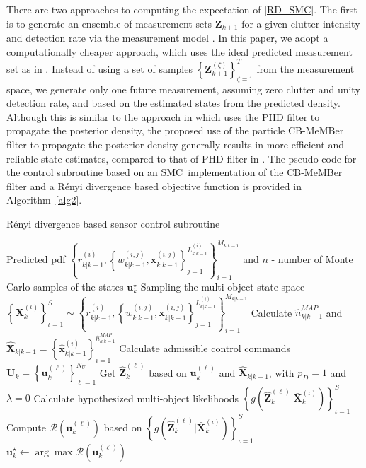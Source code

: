 \documentclass[twocolumn]{autart}
\begin{document}
There are two approaches to computing the expectation of \eqref{RD_SMC}. The
first is to generate an ensemble of measurement sets $\mathbf{Z}_{k+1}$ for
a given clutter intensity and detection rate via the measurement model \cite {RV10}. In this paper, we adopt a computationally cheaper approach, which
uses the ideal predicted measurement set as in \cite{Mah04,RVC11}. Instead
of using a set of samples $\left\{ \mathbf{Z}_{k+1}^{(\zeta)}\right\}
_{\zeta=1}^{T}$ from the measurement space, we generate only one future
measurement, assuming zero clutter and unity detection rate, and based on
the estimated states from the predicted density. Although this is similar to
the approach in \cite{RVC11} which uses the PHD filter to propagate the
posterior density, the proposed use of the particle CB-MeMBer filter to
propagate the posterior density generally results in more efficient and
reliable state estimates, compared to that of PHD filter in \cite{RVC11}. The pseudo code for the control subroutine based on an SMC\
implementation of the CB-MeMBer filter and a R\'{e}nyi divergence based objective function is
provided in Algorithm~\ref{alg2}.
\begin{algorithm}[htb]
\caption{R\'enyi divergence based sensor control subroutine}
\label{alg2}
\begin{algorithmic}[1]
    \Require Predicted pdf $\left\lbrace r_{k|k-1}^{(i)}, \left\lbrace w_{k|k-1}^{(i,j)},\mathbf{x}_{k|k-1}^{(i,j)}\right\rbrace_{j=1}^{L_{k|k-1}^{(i)}}\right\rbrace_{i=1}^{M_{k|k-1}}$ and $n$ - number of Monte Carlo samples of the states 
    \Ensure $\mathbf{u}_k^\star$
    \State Sampling the multi-object state space
    \Statex \quad \; $\left\{\mathbf{\bar{X}}_{k}^{(\iota)}\right\}_{\iota=1}^{S} \sim \left\lbrace r_{k|k-1}^{(i)}, \left\lbrace w_{k|k-1}^{(i,j)},\mathbf{x}_{k|k-1}^{(i,j)}\right\rbrace_{j=1}^{L_{k|k-1}^{(i)}}\right\rbrace_{i=1}^{M_{k|k-1}}$
    \State Calculate $\hat{n}^{MAP}_{k|k-1}$ and $\mathbf{\hat{X}}_{k|k-1}=\left\{\mathbf{\hat{x}}_{k|k-1}^{(i)}\right\}_{i=1}^{\hat{n}^{MAP}_{k|k-1}}$
    \State Calculate admissible control commands
    $\mathbf{U}_k=\left\{\mathbf{u}_k^{(\ell)}\right\}_{\ell=1}^{N_U}$
    \For{$\ell \gets 1, N_U$}
    \State Get $\mathbf{\hat{Z}}_{k}^{(\ell)}$ based on $\mathbf{u}_k^{(\ell)}$ and $\mathbf{\hat{X}}_{k|k-1}$, with $p_D=1$
    \Statex \quad\; and $\lambda=0$
    \State Calculate hypothesized multi-object likelihoods
    \Statex \quad\;$\left\lbrace g\left(\mathbf{\hat{Z}}_{k}^{(\ell)}|\mathbf{\bar{X}}_{k}^{(\iota)}\right)\right\rbrace_{\iota=1}^{S}$
    \State Compute $\mathcal{R}\left(\mathbf{u}_k^{(\ell)}\right)$ based on $\left\lbrace g\left(\mathbf{\hat{Z}}_{k}^{(\ell)}|\mathbf{\bar{X}}_{k}^{(\iota)}\right)\right\rbrace_{\iota=1}^{S}$
    \EndFor
    \State $\mathbf{u}_k^\star \gets \arg\max \mathcal{R}\left(\mathbf{u}_k^{(\ell)}\right)$
\end{algorithmic}
\end{algorithm}
\end{document}
